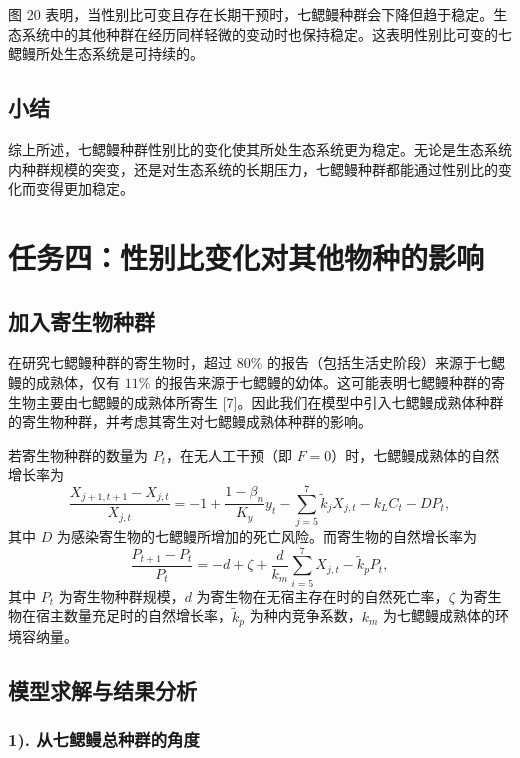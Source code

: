 \documentclass[11pt,a4paper]{ctexart}
\begin{document}
图 20 表明，当性别比可变且存在长期干预时，七鳃鳗种群会下降但趋于稳定。生态系统中的其他种群在经历同样轻微的变动时也保持稳定。这表明性别比可变的七鳃鳗所处生态系统是可持续的。

\subsection{小结}

综上所述，七鳃鳗种群性别比的变化使其所处生态系统更为稳定。无论是生态系统内种群规模的突变，还是对生态系统的长期压力，七鳃鳗种群都能通过性别比的变化而变得更加稳定。

\section{任务四：性别比变化对其他物种的影响}

\subsection{加入寄生物种群}

在研究七鳃鳗种群的寄生物时，超过 $80\%$ 的报告（包括生活史阶段）来源于七鳃鳗的成熟体，仅有 $11\%$ 的报告来源于七鳃鳗的幼体。这可能表明七鳃鳗种群的寄生物主要由七鳃鳗的成熟体所寄生 [7]。因此我们在模型中引入七鳃鳗成熟体种群的寄生物种群，并考虑其寄生对七鳃鳗成熟体种群的影响。

若寄生物种群的数量为 $P_t$，在无人工干预（即 $F=0$）时，七鳃鳗成熟体的自然增长率为
\begin{equation}
\frac{X_{j+1,t+1}-X_{j,t}}{X_{j,t}}=-1+\frac{1-\beta_n}{K_y}y_t-\sum_{j=5}^{7}\tilde{k}_jX_{j,t}-k_LC_t-DP_t,
\end{equation}
其中 $D$ 为感染寄生物的七鳃鳗所增加的死亡风险。而寄生物的自然增长率为
\begin{equation}
\frac{P_{t+1}-P_t}{P_t}=-d+\zeta+\frac{d}{k_m}\sum_{i=5}^{7}X_{j,t}-\tilde{k}_pP_t,
\end{equation}
其中 $P_t$ 为寄生物种群规模，$d$ 为寄生物在无宿主存在时的自然死亡率，$\zeta$ 为寄生物在宿主数量充足时的自然增长率，$\tilde{k}_p$ 为种内竞争系数，$k_m$ 为七鳃鳗成熟体的环境容纳量。

\subsection{模型求解与结果分析}

\subsubsection*{1). 从七鳃鳗总种群的角度}
\end{document}
